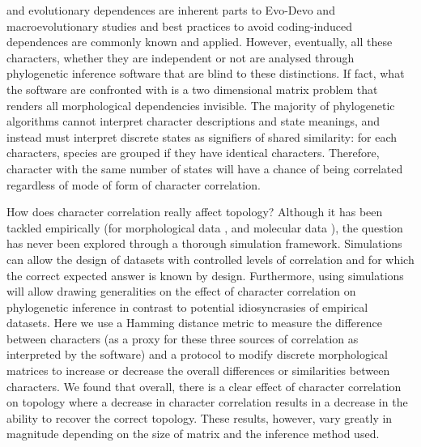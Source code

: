 \documentclass[12pt,letterpaper]{article}
\begin{document}
\color{black}{Intra-organismal} and evolutionary dependences are inherent parts to Evo-Devo and macroevolutionary studies and best practices to avoid coding-induced dependences are commonly known and applied.
However, eventually, all these characters, whether they are independent or not are analysed through phylogenetic inference software that are blind to these distinctions.
If fact, what the software are confronted with is a two dimensional matrix problem that renders all morphological dependencies invisible.
The majority of phylogenetic algorithms cannot interpret character descriptions and state meanings, and instead must interpret discrete states as signifiers of shared similarity: for each characters, species are grouped if they have identical characters.
Therefore, character with the same number of states will have a chance of being correlated regardless of mode of form of character correlation.

\noindent How does character correlation really affect topology?
Although it has been tackled empirically (for morphological data \citealt{Davalos01072014}, and molecular data \citealt{ZouConvergence}), the question has never been explored through a thorough simulation framework.
Simulations can allow the design of datasets with controlled levels of correlation and for which the correct expected answer is known by design.
Furthermore, using simulations will allow drawing generalities on the effect of character correlation on phylogenetic inference in contrast to potential idiosyncrasies of empirical datasets.
Here we use a Hamming distance metric to measure the difference between characters (as a proxy for these three sources of correlation as interpreted by the software) and a protocol to modify discrete morphological matrices to increase or decrease the overall differences or similarities between characters.
We found that overall, there is a clear effect of character correlation on topology where a decrease in character correlation results in a decrease in the ability to recover the correct topology.
These results, however, vary greatly in magnitude depending on the size of matrix and the inference method used.

%
%
\end{document}
